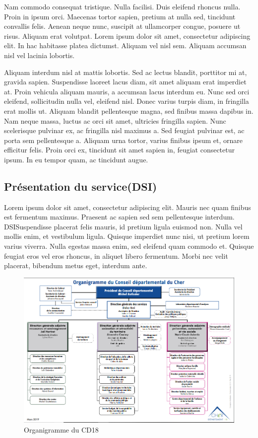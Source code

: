 \documentclass{report}
\begin{document}
Nam commodo consequat tristique. Nulla facilisi. Duis eleifend rhoncus nulla. Proin in ipsum orci. Maecenas tortor sapien, pretium at nulla sed, tincidunt convallis felis. Aenean neque nunc, suscipit at ullamcorper congue, posuere ut risus. Aliquam erat volutpat. Lorem ipsum dolor sit amet, consectetur adipiscing elit. In hac habitasse platea dictumst. Aliquam vel nisl sem. Aliquam accumsan nisl vel lacinia lobortis.

Aliquam interdum nisl at mattis lobortis. Sed ac lectus blandit, porttitor mi at, gravida sapien. Suspendisse laoreet lacus diam, sit amet aliquam erat imperdiet at. Proin vehicula aliquam mauris, a accumsan lacus interdum eu. Nunc sed orci eleifend, sollicitudin nulla vel, eleifend nisl. Donec varius turpis diam, in fringilla erat mollis ut. Aliquam blandit pellentesque magna, sed finibus massa dapibus in. Nam neque massa, luctus ac orci sit amet, ultricies fringilla sapien. Nunc scelerisque pulvinar ex, ac fringilla nisl maximus a. Sed feugiat pulvinar est, ac porta sem pellentesque a. Aliquam urna tortor, varius finibus ipsum et, ornare efficitur felis. Proin orci ex, tincidunt sit amet sapien in, feugiat consectetur ipsum. In eu tempor quam, ac tincidunt augue.

\subsection{Présentation du service(\gls{DSI})}

Lorem ipsum dolor sit amet, consectetur adipiscing elit. Mauris nec quam finibus est fermentum maximus. Praesent ac sapien sed sem pellentesque interdum. \gls{DSI}Suspendisse placerat felis mauris, id pretium ligula euismod non. Nulla vel mollis enim, et vestibulum ligula. Quisque imperdiet nunc nisi, ut pretium lorem varius viverra. Nulla egestas massa enim, sed eleifend quam commodo et. Quisque feugiat eros vel eros rhoncus, in aliquet libero fermentum. Morbi nec velit placerat, bibendum metus eget, interdum ante.

\begin{figure}[!h]
\centering
\includegraphics[width=17cm]{./images/images/organigrammeconseil}
\caption{Organigramme du CD18}
\end{figure}
\end{document}
